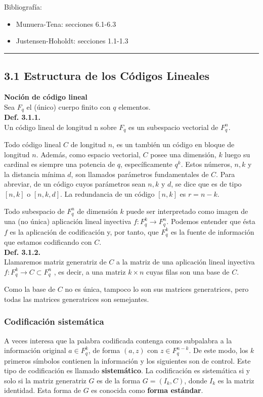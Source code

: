 \documentclass{article}
\newcommand{\hlinecolor}{\noindent\textcolor{azuloscuro}{\rule{\textwidth}{1pt}}}
\begin{document}
Bibliografía:
\begin{itemize}
\item Munuera-Tena: secciones 6.1-6.3
\item Justensen-Hoholdt: secciones 1.1-1.3
\end{itemize}
\hlinecolor{}
\vspace{0.5cm}

\subsection{3.1 Estructura de los Códigos Lineales} 
\textbf{Noción de código lineal}\\
Sea $F_{q}$ el (único) cuerpo finito con $q$ elementos. \\

\textbf{Def. 3.1.1.}\\
Un código lineal de longitud n sobre $F_{q}$ es un subespacio vectorial de $F_{q}^n$. 

Todo código lineal $C$ de longitud $n$, es un también un código en bloque de longitud $n$.  Además, como espacio vectorial, $C$ posee una dimensión, $k$  luego su cardinal es siempre una potencia de $q$, específicamente $q^k$. Estos números, $n,k$ y la distancia mínima $d$, son llamados parámetros fundamentales de $C$. Para abreviar, de un código cuyos parámetros sean $n,k \text{ y }  d$, se dice que es de tipo  $[n,k]$ o $[n,k,d]$. 
La redundancia de un código $[n,k]$ es $r = n-k$.

Todo subespacio de $F_{q}^n$ de dimensión $k$ puede ser interpretado como imagen de una (no única) aplicación lineal inyectiva $f:F_{q}^k\to F_{q}^n$. Podemos entender que ésta $f$ es la aplicación de codificación y, por tanto, que $F^k_{q}$ es la fuente de información que estamos codificando  con $C$. \\ 

\textbf{Def. 3.1.2.}  \\
Llamaremos matriz generatriz de $C$ a la matriz de una aplicación lineal inyectiva $f: F_{q}^k\to C\subset F_{q}^n$ , es decir, a una matriz $k \times n$ cuyas filas son una base de $C$.

Como la base de $C$ no es única, tampoco lo son sus matrices generatrices, pero todas las matrices generatrices son semejantes. 

\subsubsection{Codificación sistemática}
A veces interesa que la palabra codificada contenga como subpalabra a la información original $a \in F_{q}^{k}$, de forma $(a, z)$ con $z \in F_{q}^{n-k}$. De este modo, los $k$ primeros símbolos contienen la información y los siguientes son de control. Este tipo de codificación es llamado \textbf{sistemático}.
La codificación es sistemática si y solo si la matriz generatriz $G$ es de la forma $G=(I_{k}, C)$, donde $I_{k}$ es la matriz identidad. Esta forma de $G$ es conocida como \textbf{forma estándar}.
\end{document}
